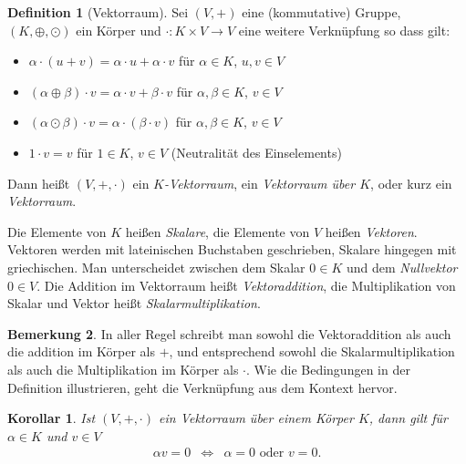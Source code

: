 \documentclass[index=totoc]{scrartcl}%
\newtheorem{cor}[thm]{Korollar}
\theoremstyle{definition}
\newtheorem{defi}{Definition}[section]
\newtheorem{bem}[defi]{Bemerkung}
\begin{document}
\begin{defi}[Vektorraum]
  Sei $(V,+)$ eine (kommutative) Gruppe, $(K,\oplus,\odot)$ ein Körper
  und $\cdot\colon K\times V\to V$ eine weitere Verknüpfung so dass gilt: 
  \begin{itemize}
  \item
    $\alpha\cdot(u+v)=\alpha\cdot u+\alpha\cdot v$
    für $\alpha\in K$, $u,v\in V$
  \item 
    $(\alpha\oplus \beta)\cdot v=\alpha\cdot v+\beta\cdot v$
    für $\alpha,\beta\in K$, $v\in V$
  \item
    $(\alpha\odot\beta) \cdot v = \alpha \cdot (\beta \cdot v)$
    für $\alpha,\beta\in K$, $v\in V$
  \item 
    $1 \cdot v = v$ für $1\in K$, $v\in V$ (Neutralität des Einselements)
  \end{itemize}

  Dann heißt $(V,+,\cdot)$ ein {\em $K$-Vektorraum},
  ein {\em Vektorraum über $K$}, oder kurz ein {\em Vektorraum}.

  Die Elemente von $K$ heißen {\em Skalare},
  die Elemente von $V$ heißen {\em Vektoren}.
  Vektoren werden mit lateinischen Buchstaben geschrieben,
  Skalare hingegen mit griechischen.
  Man unterscheidet zwischen dem Skalar $0\in K$
  und dem {\em Nullvektor} $0\in V$. 
  Die Addition im Vektorraum heißt {\em Vektoraddition},
  die Multiplikation von Skalar und Vektor heißt {\em Skalarmultiplikation}. 
\end{defi}

\begin{bem}
  In aller Regel schreibt man sowohl die Vektoraddition
  als auch die addition im Körper als $+$,
  und entsprechend sowohl die Skalarmultiplikation
  als auch die Multiplikation im Körper als $\cdot$.
  Wie die Bedingungen in der Definition illustrieren,
  geht die Verknüpfung aus dem Kontext hervor. 
\end{bem}

\begin{cor}\label{cor:factor0V}
  Ist $(V, +, \cdot)$ ein Vektorraum über einem Körper $K$,
  dann gilt für $\alpha\in K$ und $v\in V$
  \begin{eqnarray*}
    \alpha v=0 & \iff & \alpha=0\text{ oder }v=0. 
  \end{eqnarray*}
\end{cor}
\end{document}
